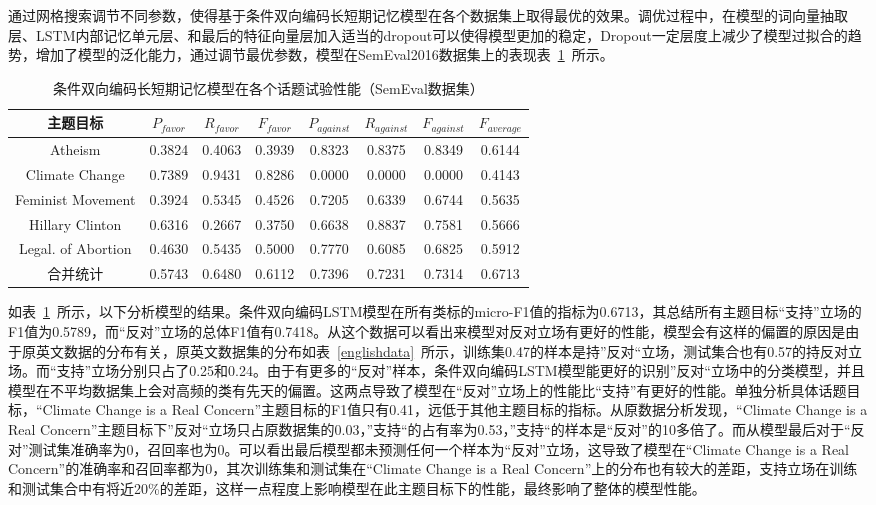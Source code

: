通过网格搜索调节不同参数，使得基于条件双向编码长短期记忆模型在各个数据集上取得最优的效果。调优过程中，在模型的词向量抽取层、LSTM内部记忆单元层、和最后的特征向量层加入适当的dropout可以使得模型更加的稳定，Dropout一定层度上减少了模型过拟合的趋势，增加了模型的泛化能力，通过调节最优参数，模型在SemEval2016数据集上的表现表~\ref{conditional_semeval}~所示。
\begin{table}[htbp]
	\caption[table123]{条件双向编码长短期记忆模型在各个话题试验性能（SemEval数据集）}
	\label{conditional_semeval}
	\vspace{0.5em}\centering\wuhao
	\begin{tabular}{cccccccc}
		\toprule[1.5pt]
		主题目标& $P_{favor}$&$R_{favor}$&$F_{favor}$&$P_{against}$&$R_{against}$&$F_{against}$&$F_{average}$ \\
		\midrule[1pt]
		Atheism&0.3824&0.4063&0.3939&0.8323&0.8375&0.8349&0.6144\\
		Climate Change&0.7389&0.9431&0.8286&0.0000&0.0000&0.0000&0.4143\\
		Feminist Movement&0.3924&0.5345&0.4526&0.7205&0.6339&0.6744&0.5635\\
		Hillary Clinton&0.6316&0.2667&0.3750&0.6638&0.8837&0.7581&0.5666\\
		Legal. of Abortion&0.4630&0.5435&0.5000&0.7770&0.6085&0.6825&0.5912\\
		合并统计&0.5743&0.6480&0.6112&0.7396&0.7231&0.7314&0.6713\\
		\bottomrule[1.5pt]
	\end{tabular}
\end{table}

如表~\ref{conditional_semeval}~所示，以下分析模型的结果。条件双向编码LSTM模型在所有类标的micro-F1值的指标为0.6713，其总结所有主题目标“支持”立场的F1值为0.5789，而“反对”立场的总体F1值有0.7418。从这个数据可以看出来模型对反对立场有更好的性能，模型会有这样的偏置的原因是由于原英文数据的分布有关，原英文数据集的分布如表~\ref{englishdata}~所示，训练集0.47的样本是持”反对“立场，测试集合也有0.57的持反对立场。而“支持”立场分别只占了0.25和0.24。由于有更多的“反对”样本，条件双向编码LSTM模型能更好的识别”反对“立场中的分类模型，并且模型在不平均数据集上会对高频的类有先天的偏置。这两点导致了模型在“反对”立场上的性能比“支持”有更好的性能。单独分析具体话题目标，“Climate Change is a Real Concern”主题目标的F1值只有0.41，远低于其他主题目标的指标。从原数据分析发现，“Climate Change is a Real Concern”主题目标下”反对“立场只占原数据集的0.03，”支持“的占有率为0.53，”支持“的样本是“反对”的10多倍了。而从模型最后对于“反对”测试集准确率为0，召回率也为0。可以看出最后模型都未预测任何一个样本为“反对”立场，这导致了模型在“Climate Change is a Real Concern”的准确率和召回率都为0，其次训练集和测试集在“Climate Change is a Real Concern”上的分布也有较大的差距，支持立场在训练和测试集合中有将近20\%的差距，这样一点程度上影响模型在此主题目标下的性能，最终影响了整体的模型性能。

